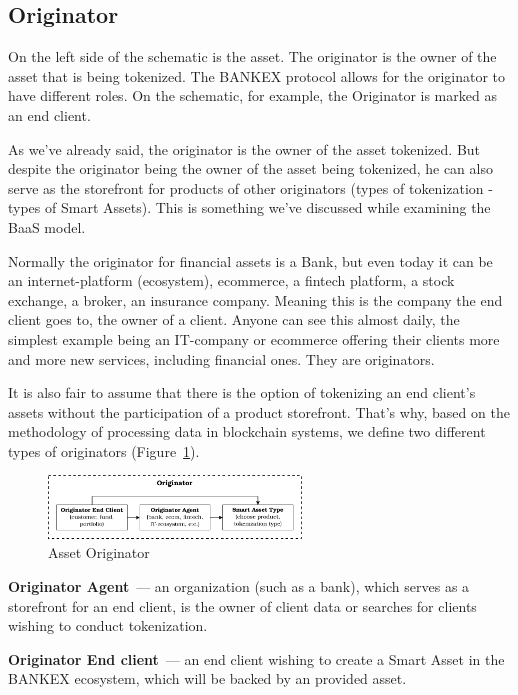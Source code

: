 \documentclass{article}
\begin{document}
\begin{multicols}{2}
\subsection{Originator}

On the left side of the schematic is the asset. The originator is the owner of the asset that is being tokenized. The BANKEX protocol allows for the originator to have different roles. On the schematic, for example, the Originator is marked as an end client.

As we've already said, the originator is the owner of the asset tokenized. But despite the originator being the owner of the asset being tokenized, he can also serve as the storefront for products of other originators (types of tokenization - types of Smart Assets). This is something we’ve discussed while examining the BaaS model.

Normally the originator for financial assets is a Bank, but even today it can be an internet-platform (ecosystem), ecommerce, a fintech platform, a stock exchange, a broker, an insurance company. Meaning this is the company the end client goes to, the owner of a client. Anyone can see this almost daily, the simplest example being an IT-company or ecommerce offering their clients more and more new services, including financial ones. They are originators.

It is also fair to assume that there is the option of tokenizing an end client’s assets without the participation of a product storefront. That's why, based on the methodology of processing data in blockchain systems, we define two different types of originators (Figure~\ref{fig:originator}).

\begin{figure}
  \centering
  \includegraphics[width=0.6\textwidth]{originator.pdf}
  \caption{Asset Originator}
  \label{fig:originator}
\end{figure}

\textbf{Originator Agent}~--- an organization (such as a bank), which serves as a storefront for an end client, is the owner of client data or searches for clients wishing to conduct tokenization.

\textbf{Originator End client}~--- an end client wishing to create a Smart Asset in the BANKEX ecosystem, which will be backed by an provided asset.


\end{multicols}
\end{document}
